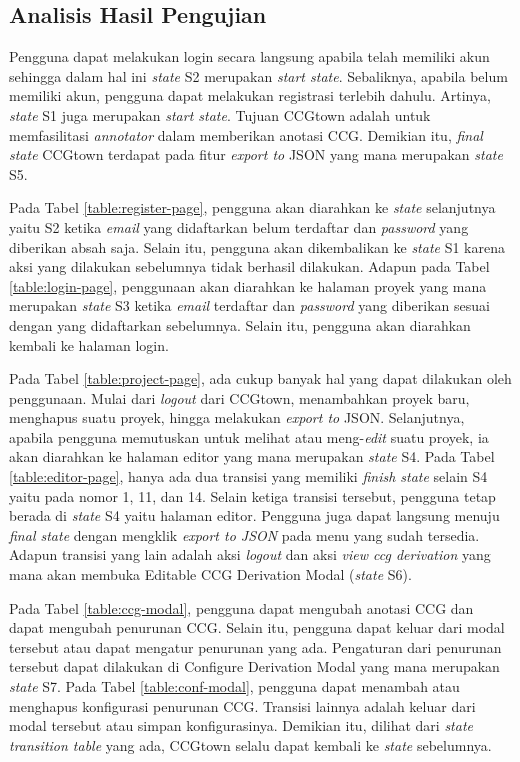 \subsection{Analisis Hasil Pengujian}

Pengguna dapat melakukan login secara langsung apabila telah memiliki akun sehingga dalam hal ini
\textit{state} S2 merupakan \textit{start state}. Sebaliknya, apabila belum memiliki akun, pengguna
dapat melakukan registrasi terlebih dahulu. Artinya, \textit{state} S1 juga merupakan
\textit{start state}. Tujuan CCGtown adalah untuk memfasilitasi \textit{annotator} dalam memberikan
anotasi CCG. Demikian itu, \textit{final state} CCGtown terdapat pada fitur \textit{export to} JSON
yang mana merupakan \textit{state} S5.

Pada Tabel \ref{table:register-page}, pengguna akan diarahkan ke \textit{state} selanjutnya yaitu
S2 ketika \textit{email} yang didaftarkan belum terdaftar dan \textit{password} yang diberikan absah
saja. Selain itu, pengguna akan dikembalikan ke \textit{state} S1 karena aksi yang dilakukan
sebelumnya tidak berhasil dilakukan. Adapun pada Tabel \ref{table:login-page}, penggunaan akan
diarahkan ke halaman proyek yang mana merupakan \textit{state} S3 ketika \textit{email} terdaftar
dan \textit{password} yang diberikan sesuai dengan yang didaftarkan sebelumnya. Selain itu,
pengguna akan diarahkan kembali ke halaman login.

Pada Tabel \ref{table:project-page}, ada cukup banyak hal yang dapat dilakukan oleh penggunaan.
Mulai dari \textit{logout} dari CCGtown, menambahkan proyek baru, menghapus suatu proyek, hingga
melakukan \textit{export to} JSON. Selanjutnya, apabila pengguna memutuskan untuk melihat atau
meng-\textit{edit} suatu proyek, ia akan diarahkan ke halaman editor yang mana merupakan
\textit{state} S4. Pada Tabel \ref{table:editor-page}, hanya ada dua transisi yang memiliki
\textit{finish state} selain S4 yaitu pada nomor 1, 11, dan 14. Selain ketiga transisi tersebut,
pengguna tetap berada di \textit{state} S4 yaitu halaman editor. Pengguna juga dapat langsung
menuju \textit{final state} dengan mengklik \textit{export to JSON} pada menu yang sudah tersedia.
Adapun transisi yang lain adalah aksi \textit{logout} dan aksi \textit{view ccg derivation} yang
mana akan membuka Editable CCG Derivation Modal (\textit{state} S6).

Pada Tabel \ref{table:ccg-modal}, pengguna dapat mengubah anotasi CCG dan dapat mengubah
penurunan CCG. Selain itu, pengguna dapat keluar dari modal tersebut atau dapat mengatur penurunan
yang ada. Pengaturan dari penurunan tersebut dapat dilakukan di Configure Derivation Modal yang
mana merupakan \textit{state} S7. Pada Tabel \ref{table:conf-modal}, pengguna dapat menambah
atau menghapus konfigurasi penurunan CCG. Transisi lainnya adalah keluar dari modal tersebut atau
simpan konfigurasinya. Demikian itu, dilihat dari \textit{state transition table} yang ada, CCGtown
selalu dapat kembali ke \textit{state} sebelumnya.



